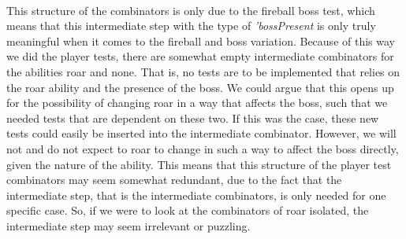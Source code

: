 \\
This structure of the combinators is only due to the fireball boss test, which means that this intermediate step with the type of \textit{'bossPresent} is only truly meaningful when it comes to the fireball and boss variation. Because of this way we did the player tests, there are somewhat empty intermediate combinators for the abilities roar and none. That is, no tests are to be implemented that relies on the roar ability and the presence of the boss. We could argue that this opens up for the possibility of changing roar in a way that affects the boss, such that we needed tests that are dependent on these two. If this was the case, these new tests could easily be inserted into the intermediate combinator. However, we will not and do not expect to roar to change in such a way to affect the boss directly, given the nature of the ability. This means that this structure of the player test combinators may seem somewhat redundant, due to the fact that the intermediate step, that is the intermediate combinators, is only needed for one specific case. So, if we were to look at the combinators of roar isolated, the intermediate step may seem irrelevant or puzzling. 